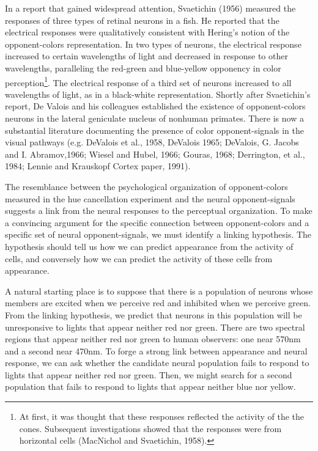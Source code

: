 In a report that gained widespread attention, Svaetichin (1956)
measured the responses of three types of retinal neurons in a fish.
He reported that the electrical responses were qualitatively
consistent with Hering's notion of the opponent-colors
representation.  In two types of neurons, the electrical response
increased to certain wavelengths of light and decreased in response
to other wavelengths, paralleling the red-green and blue-yellow
opponency in color perception\footnote{ At first, it was thought that
these responses reflected the activity of the the cones.  Subsequent
investigations showed that the responses were from horizontal cells
(MacNichol and Svaetichin, 1958).}.  The electrical response of a
third set of neurons increased to all wavelengths of light, as in a
black-white representation.  Shortly after Svaetichin's report, De
Valois and his colleagues established the existence of
opponent-colors neurons in the lateral geniculate nucleus of nonhuman
primates.  There is now a substantial literature documenting the
presence of color opponent-signals in the visual pathways (e.g.
DeValois et al., 1958, DeValois 1965; DeValois, G. Jacobs and I.
Abramov,1966; Wiesel and Hubel, 1966; Gouras, 1968; Derrington, et
al., 1984; Lennie and Krauskopf Cortex paper, 1991).

The resemblance between the psychological organization of
opponent-colors measured in the hue cancellation experiment and the
neural opponent-signals suggests a link from the neural responses to
the perceptual organization.  To make a convincing argument for the
specific connection between opponent-colors and a specific set of
neural opponent-signals, we must identify a linking hypothesis.  The
hypothesis should tell us how we can predict appearance from the
activity of cells, and conversely how we can predict the activity of
these cells from appearance.

A natural starting place is to suppose that there is a population of
neurons whose members are excited when we perceive red and inhibited
when we perceive green.  From the linking hypothesis, we predict that
neurons in this population will be unresponsive to lights that appear
neither red nor green.  There are two spectral regions that appear
neither red nor green to human observers: one near 570nm and a second
near 470nm.  To forge a strong link between appearance and neural
response, we can ask whether the candidate neural population fails to
respond to lights that appear neither red nor green.  Then, we might
search for a second population that fails to respond to lights that
appear neither blue nor yellow.

